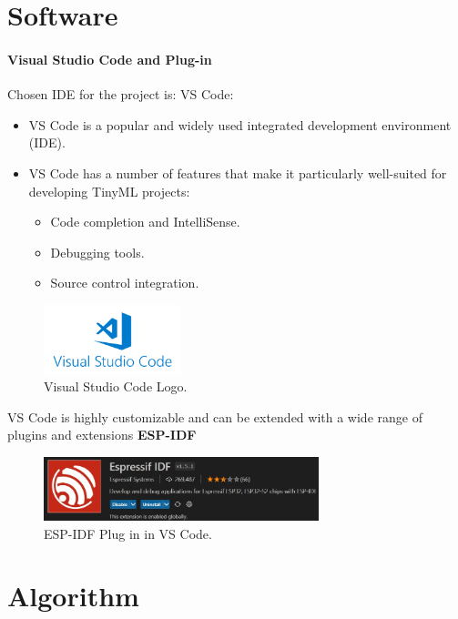 \section{Software}

\STANDARD{\insertsection}
{ 
	\framesubtitle{\insertsubsection}
	\framesubtitle{Visual Studio Code and Plug-in}
	Chosen IDE for the project is: VS Code: 
	\begin{itemize}
	\item VS Code is a popular and widely used integrated development environment (IDE).
	\item VS Code has a number of features that make it particularly well-suited for developing TinyML projects:
	\begin{itemize}
		\item Code completion and IntelliSense.
		\item Debugging tools.
		\item Source control integration.
	\end{itemize}
	\end{itemize}

	\begin{figure}  [!h]
		\begin{center}
			\includegraphics[width=4cm]{images/ListMaterialvscode.jpg}
			\caption{Visual Studio Code Logo.}
		\end{center}
	\end{figure}
	
	VS Code is highly customizable and can be extended with a wide range of plugins and extensions \textbf{ESP-IDF}
	\begin{figure}  [!h]
		\begin{center}
			\includegraphics[width=8cm]{images/ListMaterialIDF}
			\caption{ESP-IDF Plug in in VS Code.}
		\end{center}
	\end{figure}
}

\section{Algorithm}

